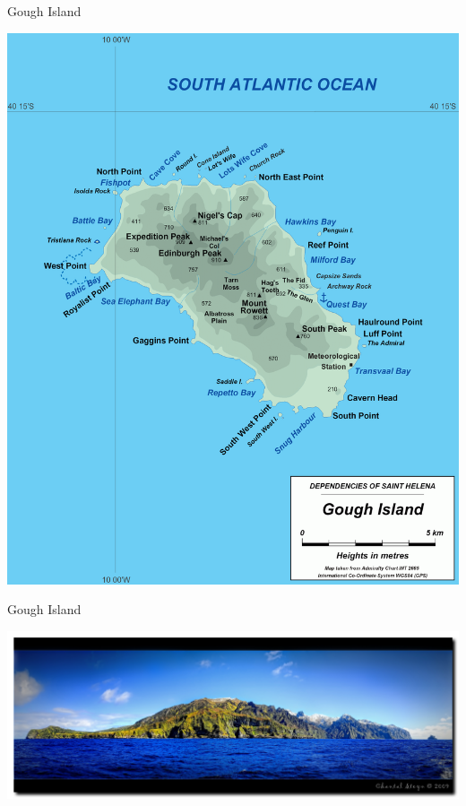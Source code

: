 \documentclass[12pt]{article}
\newcommand{\headsize}{\fontsize{35}{35} \selectfont}
\begin{document}
\newpage

\addtocounter{page}{-1}

\headsize \color{myyellow}
\hfill \begin{minipage}{5.75in}
\centering
Gough Island
\end{minipage}

\vspace{25mm}

\centerline{\includegraphics[height=0.8\textheight]{Figs/Gough-Island-Map.png}}


\newpage

\addtocounter{page}{-1}

\headsize \color{myyellow}
\hfill \begin{minipage}{5.75in}
\centering
Gough Island
\end{minipage}

\vspace{25mm}

\centerline{\includegraphics[width=\textwidth]{Figs/gough_wholeisland.jpg}}
\end{document}
